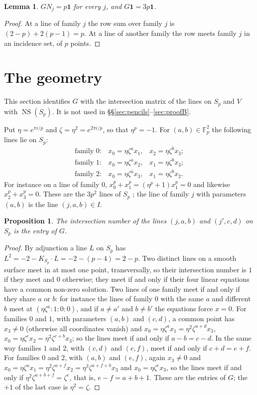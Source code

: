 \documentclass[11pt]{article}
\newtheorem{lemma}[theorem]{Lemma}
\newtheorem{proposition}[theorem]{Proposition}
\theoremstyle{definition}
\theoremstyle{remark}
\newcommand{\F}{\mathbb{F}}
\newcommand{\NS}{\operatorname{NS}}
\newcommand{\one}{\mathbf{1}}
\begin{document}
\begin{lemma}\label{lem:N}
$GN_j=p\one$ for every $j$, and $G\one=3p\one$.
\end{lemma}

\begin{proof}
At a line of family $j$ the row sum over family $j$ is $(2-p)+2(p-1)=p$. At a line of another family the row meets family $j$ in an incidence set, of $p$ points.
\end{proof}

\section{The geometry}\label{sec:geometry}

This section identifies $G$ with the intersection matrix of the lines on $S_p$ and $V$ with $\NS(S_p)$. It is not used in \S\S\ref{sec:pencils}--\ref{sec:proofB}.

Put $\eta=e^{\pi i/p}$ and $\zeta=\eta^2=e^{2\pi i/p}$, so that $\eta^p=-1$. For $(a,b)\in\F_p^2$ the following lines lie on $S_p$:
\[
\begin{array}{lll}
\text{family }0: & x_0=\eta\zeta^a x_1, & x_2=\eta\zeta^b x_3;\\
\text{family }1: & x_0=\eta\zeta^a x_2, & x_1=\eta\zeta^b x_3;\\
\text{family }2: & x_0=\eta\zeta^a x_3, & x_1=\eta\zeta^b x_2.
\end{array}
\]
For instance on a line of family $0$, $x_0^p+x_1^p=(\eta^p+1)x_1^p=0$ and likewise $x_2^p+x_3^p=0$. These are the $3p^2$ lines of $S_p$ \cite{SSvL}; the line of family $j$ with parameters $(a,b)$ is the line $(j,a,b)\in I$.

\begin{proposition}\label{prop:geom}
The intersection number of the lines $(j,a,b)$ and $(j',c,d)$ on $S_p$ is the entry of $G$.
\end{proposition}

\begin{proof}
By adjunction a line $L$ on $S_p$ has $L^2=-2-K_{S_p}\cdot L=-2-(p-4)=2-p$. Two distinct lines on a smooth surface meet in at most one point, transversally, so their intersection number is $1$ if they meet and $0$ otherwise; they meet if and only if their four linear equations have a common non-zero solution. Two lines of one family meet if and only if they share $a$ or $b$: for instance the lines of family $0$ with the same $a$ and different $b$ meet at $(\eta\zeta^a:1:0:0)$, and if $a\ne a'$ and $b\ne b'$ the equations force $x=0$. For families $0$ and $1$, with parameters $(a,b)$ and $(c,d)$, a common point has $x_3\neq0$ (otherwise all coordinates vanish) and $x_0=\eta\zeta^a x_1=\eta^2\zeta^{a+d}x_3$, $x_0=\eta\zeta^c x_2=\eta^2\zeta^{c+b}x_3$; so the lines meet if and only if $a-b=c-d$. In the same way families $1$ and $2$, with $(c,d)$ and $(e,f)$, meet if and only if $c+d=e+f$. For families $0$ and $2$, with $(a,b)$ and $(e,f)$, again $x_3\neq0$ and $x_0=\eta\zeta^a x_1=\eta^2\zeta^{a+f}x_2=\eta^3\zeta^{a+f+b}x_3$ and $x_0=\eta\zeta^e x_3$, so the lines meet if and only if $\eta^2\zeta^{a+b+f}=\zeta^e$, that is, $e-f=a+b+1$. These are the entries of $G$; the $+1$ of the last case is $\eta^2=\zeta$.
\end{proof}
\end{document}
